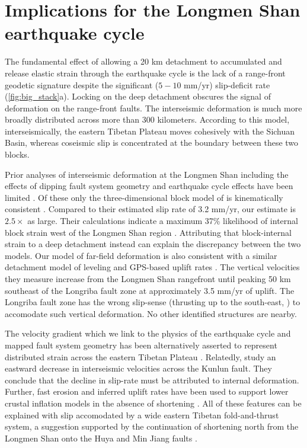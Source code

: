 \documentclass[12pt]{article}
\begin{document}
\section{Implications for the Longmen Shan earthquake cycle}
The fundamental effect of allowing a 20 km detachment to accumulated and release elastic strain through the earthquake cycle is the lack of a range-front geodetic signature despite the significant ($5-10$ mm/yr) slip-deficit rate (\ref{fig:big_stack}a). Locking on the deep detachment obscures the signal of deformation on the range-front faults. The interseismic deformation is much more broadly distributed across more than 300 kilometers. According to this model, interseismically, the eastern Tibetan Plateau moves cohesively with the Sichuan Basin, whereas coseismic slip is concentrated at the boundary between these two blocks.

Prior analyses of interseismic deformation at the Longmen Shan including the effects of dipping fault system geometry and earthquake cycle effects have been limited \citep{Loveless2011, Qi2011, Hao2014}. Of these only the three-dimensional block model of \citet{Loveless2011} is kinematically consistent \citep{minster87,mccaffrey02,Meade2005}. Compared to their estimated slip rate of 3.2 mm/yr, our estimate is $2.5 \times$ as large.  Their calculations indicate a maximum 37\% likelihood of internal block strain west of the Longmen Shan region \citep{Loveless2011}. Attributing that block-internal strain to a deep detachment instead can explain the discrepancy between the two models. Our model of far-field deformation is also consistent with a similar detachment model of leveling and GPS-based uplift rates \citep{Hao2014}. The vertical velocities they measure increase from the Longmen Shan rangefront until peaking 50 km southeast of the Longriba fault zone at approximately 3.5 mm/yr of uplift. The Longriba fault zone has the wrong slip-sense (thrusting up to the south-east, \citep{Ren2013}) to accomodate such vertical deformation. No other identified structures are nearby. 

The velocity gradient which we link to the physics of the earthquake cycle and mapped fault system geometry has been alternatively asserted to represent distributed strain across the eastern Tibetan Plateau \citep{Royden2008}. Relatedly, \citet{kirby07} study an eastward decrease in interseismic velocities across the Kunlun fault. They conclude that the decline in slip-rate must be attributed to internal deformation. Further, fast erosion and inferred uplift rates have been used to support lower crustal inflation models in the absence of shortening \citep{Kirby2003}. All of these features can be explained with slip accomodated by a wide eastern Tibetan fold-and-thrust system, a suggestion supported by the continuation of shortening north from the Longmen Shan onto the Huya \citep{kirby00} and Min Jiang faults \citep{Chen1994}. 
\end{document}

